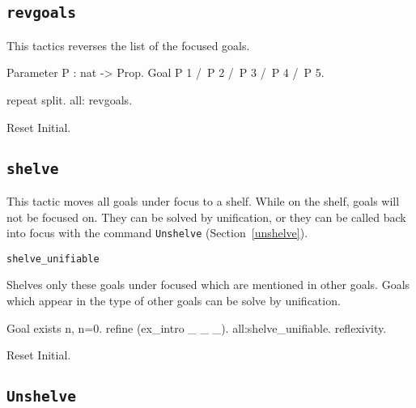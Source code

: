 \begin{coq_example*}
\subsection[\tt revgoals]{\tt revgoals}

This tactics reverses the list of the focused goals.

\Example
\begin{coq_example*}
Parameter P : nat -> Prop.
Goal P 1 /\ P 2 /\ P 3 /\ P 4 /\ P 5.
\end{coq_example*}
\begin{coq_example}
repeat split.
all: revgoals.
\end{coq_example}

\begin{coq_eval}
Reset Initial.
\end{coq_eval}



\subsection[\tt shelve]{\tt shelve\label{shelve}}

This tactic moves all goals under focus to a shelf. While on the shelf, goals
will not be focused on. They can be solved by unification, or they can be called
back into focus with the command {\tt Unshelve} (Section~\ref{unshelve}).

\begin{Variants}
  \item \texttt{shelve\_unifiable}

    Shelves only these goals under focused which are mentioned in other goals.
    Goals which appear in the type of other goals can be solve by unification.

\Example
\begin{coq_example}
Goal exists n, n=0.
refine (ex_intro _ _ _).
all:shelve_unifiable.
reflexivity.
\end{coq_example}

\begin{coq_eval}
Reset Initial.
\end{coq_eval}

\end{Variants}

\subsection[\tt Unshelve]{\tt Unshelve\label{unshelve}}


\end{coq_example*}
